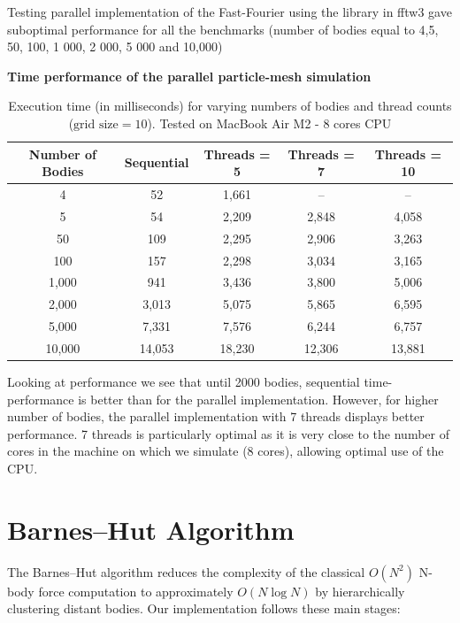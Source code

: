 \documentclass{article}
\begin{document}
Testing parallel implementation  of the Fast-Fourier using the library in fftw3 gave suboptimal performance for all the benchmarks (number of bodies equal to 4,5, 50, 100, 1 000, 2 000, 5 000 and 10,000)

\textbf{Time performance of the parallel particle-mesh simulation}
\begin{table}[htbp]
\centering
\begin{tabular}{|c|c|c|c|c|}
\hline
\textbf{Number of Bodies} & \textbf{Sequential} & \textbf{Threads = 5} & \textbf{Threads = 7} & \textbf{Threads = 10} \\
\hline
4      & 52    & 1,661  & --    & --     \\
5      & 54    & 2,209  & 2,848  & 4,058   \\
50     & 109   & 2,295  & 2,906  & 3,263   \\
100    & 157   & 2,298  & 3,034  & 3,165   \\
1,000  & 941   & 3,436  & 3,800  & 5,006   \\
2,000  & 3,013  & 5,075  & 5,865  & 6,595   \\
5,000  & 7,331  & 7,576  & 6,244  & 6,757   \\
10,000 & 14,053  & 18,230 & 12,306 & 13,881  \\
\hline
\end{tabular}
\caption{Execution time (in milliseconds) for varying numbers of bodies and thread counts ($\text{grid size} = 10$). Tested on MacBook Air M2 - 8 cores CPU}
\label{tab:thread_performance}
\end{table}

Looking at performance we see that until 2000 bodies, sequential time-performance is better than for the parallel implementation. However, for higher number of bodies, the parallel implementation with 7 threads displays better performance. 7 threads is particularly optimal as it is very close to the number of cores in the machine on which we simulate (8 cores), allowing optimal use of the CPU.  



\section{Barnes–Hut Algorithm}

The Barnes–Hut algorithm reduces the complexity of the classical \(O(N^2)\) N-body force computation to approximately \(O(N\log N)\) by hierarchically clustering distant bodies.  Our implementation follows these main stages:
\end{document}

